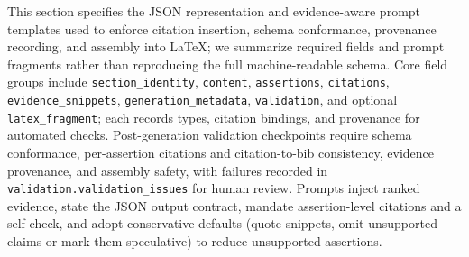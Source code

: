 This section specifies the JSON representation and evidence-aware prompt templates used to enforce citation insertion, schema conformance, provenance recording, and assembly into LaTeX; we summarize required fields and prompt fragments rather than reproducing the full machine-readable schema.  
Core field groups include \texttt{section\_identity}, \texttt{content}, \texttt{assertions}, \texttt{citations}, \texttt{evidence\_snippets}, \texttt{generation\_metadata}, \texttt{validation}, and optional \texttt{latex\_fragment}; each records types, citation bindings, and provenance for automated checks.  
Post-generation validation checkpoints require schema conformance, per-assertion citations and citation-to-bib consistency, evidence provenance, and assembly safety, with failures recorded in \texttt{validation.validation\_issues} for human review.  
Prompts inject ranked evidence, state the JSON output contract, mandate assertion-level citations and a self-check, and adopt conservative defaults (quote snippets, omit unsupported claims or mark them speculative) to reduce unsupported assertions.